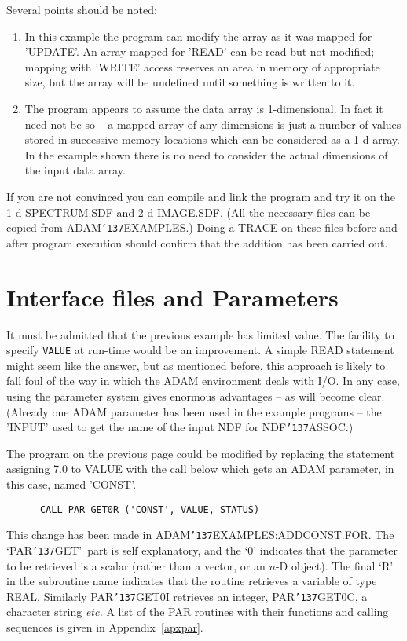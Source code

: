 \documentclass[twoside,11pt]{article}
\renewcommand{\_}{{\tt\char'137}}
\newcommand{\xlabel}[1]{}
\begin{document}
Several points should be noted:
\begin{enumerate}
\item In this example the program can modify the array as it was mapped for
'UPDATE'.
An array mapped for 'READ' can  be read but not modified;
mapping with  'WRITE' access reserves an area in memory of appropriate
size, but the array will be undefined until something is written to it.
\item The program appears to assume the data array is 1-dimensional.
In fact it need not be so -- a mapped array of any dimensions is just
a number of values stored in successive memory locations which  can
be considered as a 1-d array.
In the example shown there is no need to consider the actual dimensions
of the input data array.
\end{enumerate}
If you are not convinced you can compile and link the program and try it
on the 1-d SPECTRUM.SDF and 2-d IMAGE.SDF.  (All the necessary files can be
copied from ADAM\_EXAMPLES.)
Doing a TRACE on these files before and after program execution should
confirm that the addition has been carried out.

\newpage
\section{Interface files and Parameters\label{addconst}\xlabel{interface_files_and_paramenters}}

It must be admitted that the previous example has limited value.
The facility to specify {\tt VALUE} at run-time
would be an improvement.
A simple READ statement might seem like the answer, but as mentioned before,
this approach
is likely to fall foul of the way in which the
ADAM environment deals with I/O.
In any case, using the parameter system gives enormous advantages -- as will
become clear.
(Already one ADAM parameter has been used in the example programs -- the
'INPUT'  used to get the name of the input NDF for NDF\_ASSOC.)

The program on the previous page could be modified by replacing the
statement assigning 7.0 to VALUE with the call below which gets an
ADAM parameter, in this case, named 'CONST'.
\begin{verbatim}
      CALL PAR_GET0R ('CONST', VALUE, STATUS)
\end{verbatim}
This change has been made in ADAM\_EXAMPLES:ADDCONST.FOR.
The `PAR\_GET'\ part is self explanatory,  and the `0' indicates that
the parameter to be retrieved is a scalar
(rather than a vector, or an $n$-D object).
The final `R' in the subroutine
name indicates that the routine retrieves a variable of type REAL.
Similarly PAR\_GET0I retrieves an integer, PAR\_GET0C, a character
string {\it etc.}
A list of the PAR routines with their functions and calling
sequences is given in Appendix~\ref{apxpar}.
\end{document}
